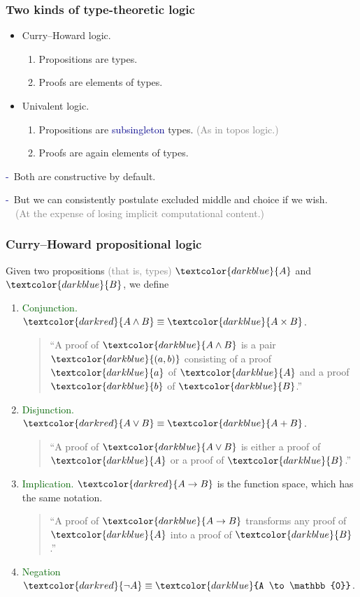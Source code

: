 \documentclass[aspectratio=169]{beamer}
\newcommand{\eqq}{\equiv}
\newcommand{\da}{\db{-}~}
\newcommand{\db}{\textcolor{darkblue}}
\newcommand{\dg}{\textcolor{darkgreen}}
\newcommand{\grey}{\textcolor{grey}}
\newcommand{\dr}{\textcolor{darkred}}
\newcommand{\m}[1]{$\db{#1}$}
\newcommand{\mm}[1]{${#1}$}
\begin{document}
\begin{frame}
  \frametitle{Two kinds of type-theoretic logic}

  \begin{itemize}
  \vfill \item Curry--Howard logic.

  \begin{enumerate}
  \item Propositions are types.
  \item Proofs are elements of types.
  \end{enumerate}

  \vfill \item Univalent logic.
  \begin{enumerate}
  \item Propositions are \db{subsingleton} types.
  \grey{(As in topos logic.)}

  \item Proofs are again elements of types.
  \end{enumerate}
  \end{itemize}

\vfill \da Both are constructive by default.

\vfill \da But we can consistently postulate excluded middle and choice if we wish. \\
\grey{~~(At the expense of losing implicit computational content.)}

\end{frame}

\begin{frame}
  \frametitle{Curry--Howard propositional logic}

Given two propositions \grey{(that is, types)} \m{A} and \m{B}, we define
\begin{enumerate}
\vfill \item \dg{Conjunction.} \mm{\dr{A \wedge B} \eqq \db{A \times B}}. \\[1ex]
  \begin{quote}
``A proof of \m{A\wedge B} is a pair \m{(a,b)} consisting of a proof \m{a} of \m{A} and a proof \m{b} of \m{B}.''    
  \end{quote}
\vfill \item \dg{Disjunction.} \mm{\dr{A \vee B} \eqq \db{A + B}}. \\[1ex]
  \begin{quote}
``A proof of \m{A\vee B} is either a proof of \m{A} or a proof of \m{B}.''    
  \end{quote}
\vfill \item \dg{Implication.} \mm{\dr{A \to B}} is the function space, which has the same notation. \\[1ex]
  \begin{quote}
``A proof of \m{A \to B} transforms any proof of \m{A} into a proof of \m{B}.''    
  \end{quote}

\vfill \item \dg{Negation} \mm{\dr{\neg A} \eqq \db{A \to \mathbb{0}}}. \\[1ex]
\end{enumerate}
\end{frame}
\end{document}
